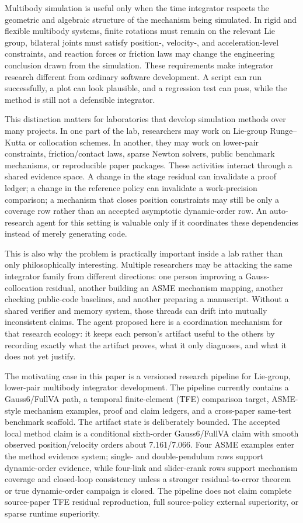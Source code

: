 \documentclass[10pt]{article}
\newcommand{\method}{Gauss6/FullVA}
\newcommand{\agent}{auto-research agent}
\begin{document}
Multibody simulation is useful only when the time integrator respects the
geometric and algebraic structure of the mechanism being simulated. In rigid
and flexible multibody systems, finite rotations must remain on the relevant
Lie group, bilateral joints must satisfy position-, velocity-, and
acceleration-level constraints, and reaction forces or friction laws may change
the engineering conclusion drawn from the simulation. These requirements make
integrator research different from ordinary software development. A script can
run successfully, a plot can look plausible, and a regression test can pass,
while the method is still not a defensible integrator.

This distinction matters for laboratories that develop simulation methods over
many projects. In one part of the lab, researchers may work on Lie-group
Runge--Kutta or collocation schemes. In another, they may work on lower-pair
constraints, friction/contact laws, sparse Newton solvers, public benchmark
mechanisms, or reproducible paper packages. These activities interact through a
shared evidence space. A change in the stage residual can invalidate a proof
ledger; a change in the reference policy can invalidate a work-precision
comparison; a mechanism that closes position constraints may still be only a
coverage row rather than an accepted asymptotic dynamic-order row. An
\agent{} for this setting is valuable only if it coordinates these dependencies
instead of merely generating code.

This is also why the problem is practically important inside a lab rather than
only philosophically interesting. Multiple researchers may be attacking the
same integrator family from different directions: one person improving a
Gauss-collocation residual, another building an ASME mechanism mapping, another
checking public-code baselines, and another preparing a manuscript. Without a
shared verifier and memory system, those threads can drift into mutually
inconsistent claims. The agent proposed here is a coordination mechanism for
that research ecology: it keeps each person's artifact useful to the others by
recording exactly what the artifact proves, what it only diagnoses, and what it
does not yet justify.

The motivating case in this paper is a versioned research pipeline for
Lie-group, lower-pair multibody integrator development. The pipeline currently
contains a \method{} path, a temporal finite-element (TFE) comparison target,
ASME-style mechanism examples, proof and claim ledgers, and a cross-paper
same-test benchmark scaffold. The artifact state is deliberately bounded. The
accepted local method claim is a conditional sixth-order \method{} claim with
smooth observed position/velocity orders about 7.161/7.066. Four ASME examples
enter the method evidence system; single- and double-pendulum rows support
dynamic-order evidence, while four-link and slider-crank rows support
mechanism coverage and closed-loop consistency unless a stronger
residual-to-error theorem or true dynamic-order campaign is closed. The
pipeline does not claim complete source-paper TFE residual reproduction, full
source-policy external superiority, or sparse runtime superiority.
\end{document}
